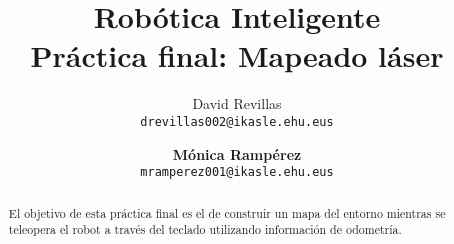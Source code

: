\documentclass[spanish]{article}
\title{Robótica Inteligente \\ \small Práctica final: Mapeado láser}
\author{
        David Revillas \\
        \texttt{drevillas002@ikasle.ehu.eus}
        \and
        \textbf{Mónica Rampérez} \\
        \texttt{mramperez001@ikasle.ehu.eus}
}
\begin{document}
\maketitle

\begin{abstract}
    El objetivo de esta práctica final es el de construir un mapa del entorno mientras se teleopera el robot a través del teclado utilizando información de odometría.
\end{abstract}

{}





\end{document}

